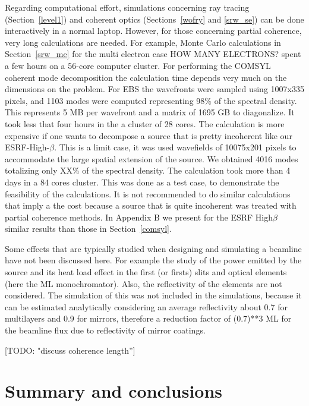 \documentclass{iucr}              %
\newcommand{\todo}[1]{{\color{red}[TODO: "#1'']}}
\newcommand{\inred}[1]{{\color{red}#1}}
\begin{document}
Regarding computational effort, simulations concerning ray tracing (Section~\ref{level1}) and coherent optics (Sections~\ref{wofry} and \ref{srw_se}) can be done interactively in a normal laptop. However, for those concerning partial coherence, very long calculations are needed. For example, Monte Carlo calculations in Section~\ref{srw_me} for the multi electron case \inred{HOW MANY ELECTRONS?} spent a few hours on a 56-core computer cluster. For performing the COMSYL coherent mode decomposition the calculation time depends very much on the dimensions on the problem. For EBS the wavefronts were sampled using 1007x335 pixels, and 1103 modes were computed representing 98\% of the spectral density. This represents 5 MB per wavefront and a matrix of 1695 GB to diagonalize. It took less that four hours in the a cluster of 28 cores. The calculation is more expensive if one wants to decompose a source that is pretty incoherent like our ESRF-High-$\beta$. This is a limit case, it was used wavefields of 10075x201 pixels to accommodate the large spatial extension of the source. We obtained 4016 modes totalizing only XX\% of the spectral density.  The calculation took more than 4 days in a 84 cores cluster. 
This was done as a test case, to demonstrate the feasibility of the calculations. It is not recommended to do similar calculations that imply a the cost because a source that is quite incoherent was treated with partial coherence methods. In Appendix B we present for the ESRF High$\beta$ similar results than those in Section~\ref{comsyl}. 

Some effects that are typically studied when designing and simulating a beamline have not been discussed here. For example the study of the power emitted by the source and its heat load effect in the first (or firsts) slits and optical elements (here the ML monochromator). Also, the reflectivity of the elements are not considered. The simulation of this was not included in the simulations, because it can be estimated analytically considering an average reflectivity about \inred{0.7 for multilayers and 0.9 for mirrors, therefore a reduction factor of (0.7)**3 ML for the beamline flux due to reflectivity of mirror coatings}. 

\todo{discuss coherence length}


\section{Summary and conclusions}
\end{document}
